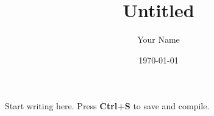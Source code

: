 \documentclass[11pt]{article}
\title{Untitled}
\author{Your Name}
\date{\today}
\begin{document}
\maketitle

Start writing here. Press \textbf{Ctrl+S} to save and compile.
\end{document}
